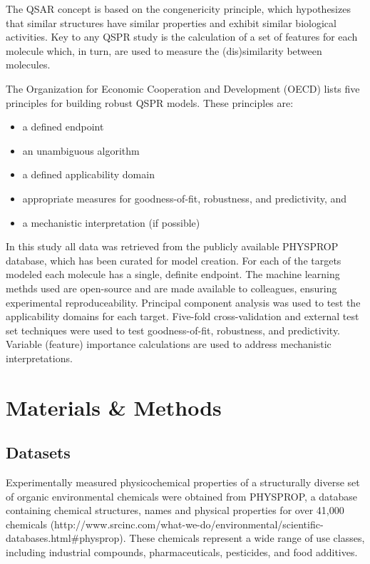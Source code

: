 \documentclass[10pt, letter]{article}
\renewcommand{\=}{\, =\, }
\newcommand{\+}{\, +\, }
\renewcommand{\-}{\, -\, }
\begin{document}
The QSAR concept
is based on the congenericity principle, which hypothesizes
that similar structures have similar properties and
exhibit similar biological activities. Key to any QSPR study is the calculation of a set of features for each molecule which, in turn, are used
to measure the (dis)similarity between molecules.

The Organization for Economic Cooperation and Development (OECD) lists five principles for building robust QSPR models. These principles are:
\begin{itemize}
\item a defined endpoint
\item an unambiguous algorithm
\item a defined applicability domain
\item appropriate measures for goodness-of-fit, robustness, and predictivity, and
\item a mechanistic interpretation (if possible)
\end{itemize}

In this study all data was retrieved from the publicly available PHYSPROP database, which has been curated for model creation. For each of the targets modeled
each molecule has a single, definite endpoint. The machine learning methds used are open-source and
are made available to colleagues, ensuring experimental reproduceability. Principal component analysis was used to test the applicability domains for each target. Five-fold cross-validation and external test set techniques were used to test goodness-of-fit, robustness, and predictivity. Variable (feature) importance calculations are used to address mechanistic interpretations.

\section{Materials \& Methods}

\subsection{Datasets}

Experimentally measured physicochemical properties of a structurally diverse set
of organic environmental chemicals were obtained from PHYSPROP, a database containing chemical structures, names and physical properties for over 41,000 chemicals (http://www.srcinc.com/what-we-do/environmental/scientific-databases.html\#physprop).  These chemicals represent a wide range of use classes,
including industrial compounds, pharmaceuticals, pesticides, and food additives.
\end{document}
